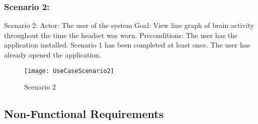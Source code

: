 \subsubsection{Scenario 2:}\label{ssec:scenar2}
Scenario 2:
Actor: The user of the system
Goal: View line graph of  brain activity throughout the time the headset was worn.
Preconditions:
The user has the application installed.
Scenario 1 has been completed at least once.
The user has already opened the application.
\begin{figure}[H]
  \centering
  \texttt{[image: UseCaseScenario2]}
  \caption{Scenario 2}\label{img:usecasescenario2}
\end{figure}



\subsection{Non-Functional Requirements}\label{ssec:non-functional-requirements}

